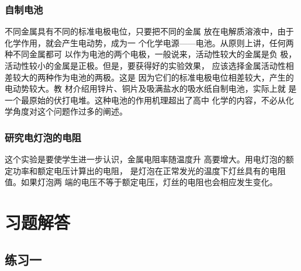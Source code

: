 \subsubsection{自制电池}
不同金属具有不同的标准电极电位，只要把不同的金属
放在电解质溶液中，由于化学作用，就会产生电动势，成为一
个化学电源——电池。从原则上讲，任何两种不同金属都可
以作为电池的两个电极，一般说来，活动性较大的金属是负
极，活动性较小的金属是正极。但是，要获得好的实验效果，
应该选择金属活动性相差较大的两种作为电池的两极。这是
因为它们的标准电极电位相差较大，产生的电动势较大。教
材介绍用锌片、铜片及吸满盐水的吸水纸自制电池，实际上就
是一个最原始的伏打电堆。这种电池的作用机理超出了高中
化学的内容，不必从化学角度对这个问题作过多的阐述。

\subsubsection{研究电灯泡的电阻}

这个实验是要使学生进一步认识，金属电阻率随温度升
高要增大。用电灯泡的额定功率和额定电压计算出的电阻，
是灯泡在正常发光的温度下灯丝具有的电阻值。如果灯泡两
端的电压不等于额定电压，灯丝的电阻也会相应发生变化。


\section{习题解答}

\subsection{练习一}







